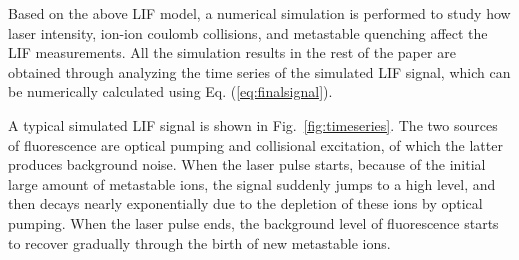 \documentclass[aip,pop,reprint]{revtex4-1}
\begin{document}

Based on the above LIF model, a numerical simulation is performed to study how laser intensity, ion-ion coulomb collisions, and metastable quenching affect the LIF measurements. All the simulation results in the rest of the paper are obtained through analyzing the time series of the simulated LIF signal, which can be numerically calculated using Eq. (\ref{eq:finalsignal}).

A typical simulated LIF signal is shown in Fig.~\ref{fig:timeseries}. The two sources of fluorescence are optical pumping and collisional excitation, of which the latter produces background noise. When the laser pulse starts, because of the initial large amount of  metastable ions, the signal suddenly jumps to a high level, and then decays nearly exponentially due to the depletion of these ions by optical pumping. When the laser pulse ends, the background level of fluorescence starts to recover gradually through the birth of new metastable ions.
\end{document}
